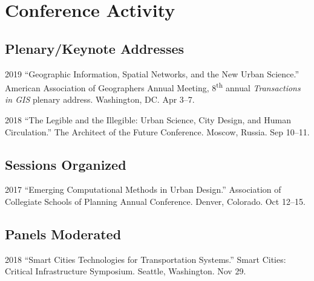 \documentclass[12pt,letterpaper]{report}
\begin{document}
	\section*{Conference Activity}

	\subsection*{Plenary/Keynote Addresses}

	\begin{tablist}

		\item[2019] \tab \enquote{Geographic Information, Spatial Networks, and the New Urban Science.} American Association of Geographers Annual Meeting, 8\textsuperscript{th} annual \emph{Transactions in GIS} plenary address. Washington, DC. Apr 3--7.

		\item[2018] \tab \enquote{The Legible and the Illegible: Urban Science, City Design, and Human Circulation.} The Architect of the Future Conference. Moscow, Russia. Sep 10--11.

	\end{tablist}

	\subsection*{Sessions Organized}

	\begin{tablist}

		\item[2017] \tab \enquote{Emerging Computational Methods in Urban Design.} Association of Collegiate Schools of Planning Annual Conference. Denver, Colorado. Oct 12--15.

	\end{tablist}

	\subsection*{Panels Moderated}

	\begin{tablist}

		\item[2018] \tab \enquote{Smart Cities Technologies for Transportation Systems.} Smart Cities: Critical Infrastructure Symposium. Seattle, Washington. Nov 29.

	\end{tablist}
\end{document}
